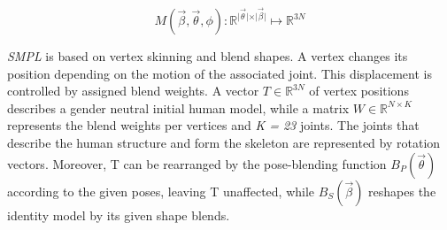 \begin{equation}
\label{eq:model}
M(\vec{\beta},\vec{\theta},\phi) : \mathbb{R}^{\vert \vec{\theta} \vert \times \vert \vec{\beta} \vert} \mapsto \mathbb{R}^{3N}
\end{equation}

\emph{SMPL} is based on vertex skinning and blend shapes. A vertex changes its position depending on the motion of the associated joint. This displacement is controlled by assigned blend weights. A vector $T \in \mathbb{R}^{3N}$ of vertex positions describes a gender neutral initial human model, while a matrix $W \in \mathbb{R}^{N \times K}$ represents the blend weights per vertices and \emph{K = 23} joints. The joints that describe the human structure and form the skeleton are represented by rotation vectors. Moreover, T can be rearranged by the pose-blending function $B_{P}(\vec{\theta})$ according to the given poses, leaving T unaffected, while $B_{S}(\vec{\beta})$ reshapes the identity model by its given shape blends.

\cite{smpl}

